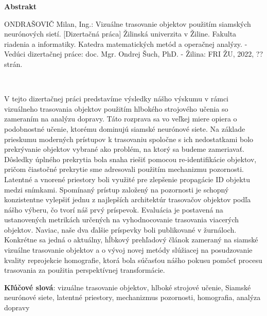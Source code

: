 \thispagestyle{plain}

\begin{center}
    \Large{\textbf{Abstrakt}}
\end{center}

\noindent ONDRAŠOVIČ Milan, Ing.: Vizuálne trasovanie objektov použitím siamských neurónových sietí.
[Dizertačná práca] Žilinská univerzita v Žiline. Fakulta riadenia a informatiky. Katedra matematických metód a operačnej analýzy. - Vedúci dizertačnej práce: doc. Mgr. Ondrej Šuch, PhD. - Žilina: FRI ŽU, 2022, ?? strán.

\


\noindent V tejto dizertačnej práci predstavíme výsledky nášho výskumu v rámci vizuálneho trasovania objektov použitím hlbokého strojového učenia so zameraním na analýzu dopravy. Táto rozprava sa vo veľkej miere opiera o podobnostné učenie, ktorému dominujú siamské neurónové siete. Na základe prieskumu moderných prístupov k trasovaniu spoločne s ich nedostatkami bolo prekrývanie objektov vybrané ako problém, na ktorý sa budeme zameriavať. Dôsledky úplného prekrytia bola snaha riešiť pomocou re-identifikácie objektov, pričom čiastočné prekrytie sme adresovali použitím mechanizmu pozornosti. Latentné a vnorené priestory boli využité pre zlepšenie propagácie ID objektu medzi snímkami. Spomínaný prístup založený na pozornosti je schopný konzistentne vylepšiť jednu z najlepších architektúr trasovačov objektov podľa nášho výberu, čo tvorí náš prvý príspevok. Evaluácia je postavená na ustanovených metrikách určených na vyhodnocovanie trasovania viacerých objektov. Naviac, naše dva ďalšie príspevky boli publikované v žurnáloch. Konkrétne sa jedná o aktuálny, hĺbkový prehľadový článok zameraný na siamské vizuálne trasovanie objektov a o vývoj novej metódy slúžiacej na posudzovanie kvality reprojekcie homografie, ktorá bola súčasťou nášho pokusu pomôcť procesu trasovania za použitia perspektívnej transformácie.

\noindent \textbf{Kľúčové slová}: vizuálne trasovanie objektov, hlboké strojové učenie, Siamské neurónové siete, latentné priestory, mechanizmus pozornosti, homografia, analýza dopravy
